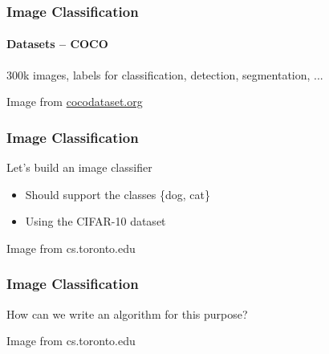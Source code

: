 \documentclass[xetex,professionalfont]{beamer}
\begin{document}
\begin{frame}
\frametitle{Image Classification}
\framesubtitle{Datasets -- COCO}

300k images, labels for classification, detection, segmentation, ... %

\bigskip

\begin{center}
    {\centering Image from \href{http://cocodataset.org}{cocodataset.org}}
\end{center}

\end{frame}


\begin{frame}
\frametitle{Image Classification}

Let's build an image classifier
\begin{itemize}
    \item Should support the classes \{dog, cat\}
    \item Using the CIFAR-10 dataset
\end{itemize}

\bigskip

\begin{center}
    {\centering Image from cs.toronto.edu}
\end{center}

\end{frame}


\begin{frame}
\frametitle{Image Classification}

How can we write an algorithm for this purpose? %

\bigskip

\begin{center}
    {\centering Image from cs.toronto.edu}
\end{center}

\end{frame}
\end{document}
